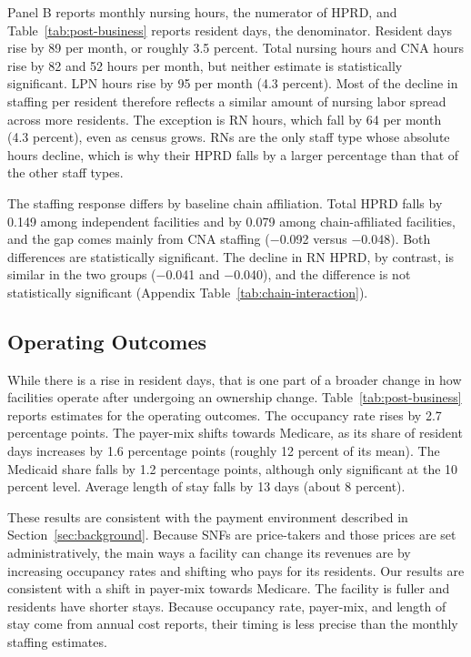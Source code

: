 \documentclass[12pt]{article}
\begin{document}
Panel B reports monthly nursing hours, the numerator of HPRD, and Table~\ref{tab:post-business} reports resident days, the denominator. Resident days rise by 89 per month, or roughly 3.5 percent. Total nursing hours and CNA hours rise by 82 and 52 hours per month, but neither estimate is statistically significant. LPN hours rise by 95 per month (4.3 percent). Most of the decline in staffing per resident therefore reflects a similar amount of nursing labor spread across more residents. The exception is RN hours, which fall by 64 per month (4.3 percent), even as census grows. RNs are the only staff type whose absolute hours decline, which is why their HPRD falls by a larger percentage than that of the other staff types.

The staffing response differs by baseline chain affiliation. Total HPRD falls by 0.149 among independent facilities and by 0.079 among chain-affiliated facilities, and the gap comes mainly from CNA staffing ($-$0.092 versus $-$0.048). Both differences are statistically significant. The decline in RN HPRD, by contrast, is similar in the two groups ($-$0.041 and $-$0.040), and the difference is not statistically significant (Appendix Table~\ref{tab:chain-interaction}).


\FloatBarrier

\subsection{Operating Outcomes}

While there is a rise in resident days, that is one part of a broader change in how facilities operate after undergoing an ownership change. Table~\ref{tab:post-business} reports estimates for the operating outcomes. The occupancy rate rises by 2.7 percentage points. The payer-mix shifts towards Medicare, as its share of resident days increases by 1.6 percentage points (roughly 12 percent of its mean). The Medicaid share falls by 1.2 percentage points, although only significant at the 10 percent level. Average length of stay falls by 13 days (about 8 percent).

These results are consistent with the payment environment described in Section~\ref{sec:background}. Because SNFs are price-takers and those prices are set administratively, the main ways a facility can change its revenues are by increasing occupancy rates and shifting who pays for its residents. Our results are consistent with a shift in payer-mix towards Medicare. The facility is fuller and residents have shorter stays. Because occupancy rate, payer-mix, and length of stay come from annual cost reports, their timing is less precise than the monthly staffing estimates. 
\end{document}
